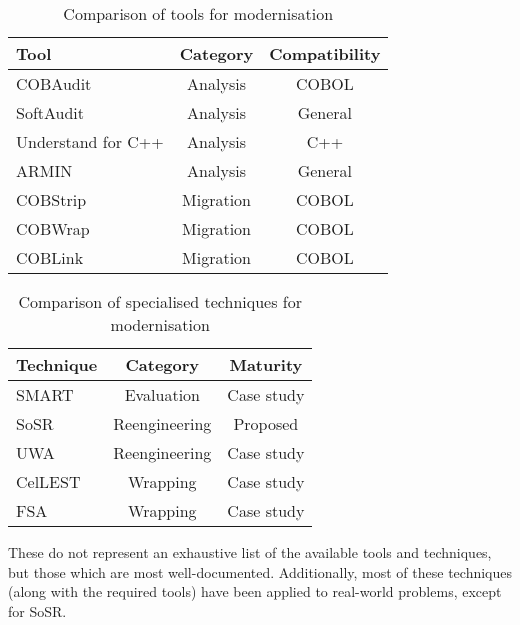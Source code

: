 \documentclass[12pt,journal,compsoc]{IEEEtran}
\begin{document}
\begin{table}[h!]
\caption{Comparison of tools for modernisation}
\label{table:tools}
\centering
\begin{tabular}{| l | c | c |}
  \hline
  \textbf{Tool} & \textbf{Category} & \textbf{Compatibility} \\ \hline
  COBAudit & Analysis & COBOL \\ \hline
  SoftAudit & Analysis & General \\ \hline
  Understand for C++ & Analysis & C++ \\ \hline
  ARMIN & Analysis & General \\ \hline
  COBStrip & Migration & COBOL \\ \hline
  COBWrap & Migration & COBOL \\ \hline
  COBLink & Migration & COBOL \\ \hline
\end{tabular}
\end{table}

\begin{table}[h!]
\caption{Comparison of specialised techniques for modernisation}
\label{table:techniques}
\centering
\begin{tabular}{| l | c | c |}
  \hline
  \textbf{Technique} & \textbf{Category} & \textbf{Maturity} \\ \hline
  SMART & Evaluation & Case study \\ \hline
  SoSR & Reengineering & Proposed \\ \hline
  UWA & Reengineering & Case study \\ \hline
  CelLEST & Wrapping & Case study \\ \hline
  FSA & Wrapping & Case study \\ \hline
\end{tabular}
\end{table}

These do not represent an exhaustive list of the available tools and techniques, but those which are most well-documented. Additionally, most of these techniques (along with the required tools) have been applied to real-world problems, except for SoSR.
\end{document}
